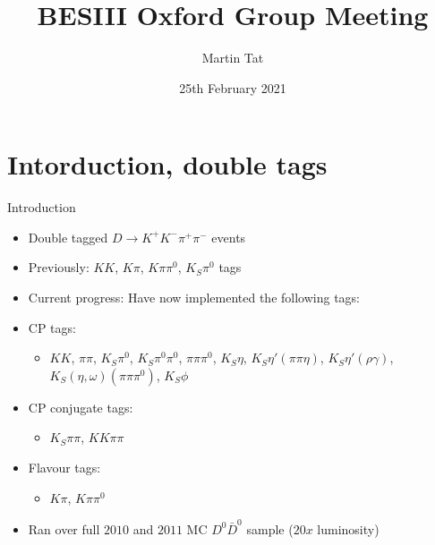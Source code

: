 \documentclass{beamer}
\title[BESIII Oxford]{BESIII Oxford Group Meeting}
\author{Martin Tat}
\institute{Oxford LHCb}
\date{25th February 2021}
\begin{document}
\begin{frame}
  \titlepage
\end{frame}


\section{Intorduction, double tags}
\begin{frame}{Introduction}
  \begin{itemize}
    \item{Double tagged $D\to K^+K^-\pi^+\pi^-$ events}
    \item{Previously: $KK$, $K\pi$, $K\pi\pi^0$, $K_S\pi^0$ tags}
    \item{Current progress: Have now implemented the following tags:}
    \item{CP tags:}
    \begin{itemize}
      \item{$KK$, $\pi\pi$, $K_S\pi^0$, $K_S\pi^0\pi^0$, $\pi\pi\pi^0$, $K_S\eta$, $K_S\eta'(\pi\pi\eta)$, $K_S\eta'(\rho\gamma)$, $K_S(\eta, \omega)(\pi\pi\pi^0)$, $K_S\phi$}
    \end{itemize}
    \item{CP conjugate tags:}
    \begin{itemize}
      \item{$K_S\pi\pi$, $KK\pi\pi$}
    \end{itemize}
    \item{Flavour tags:}
    \begin{itemize}
      \item{$K\pi$, $K\pi\pi^0$}
    \end{itemize}
    \item{Ran over full $2010$ and $2011$ MC $D^0\bar{D}^0$ sample ($20x$ luminosity)}
  \end{itemize}
\end{frame}
\end{document}
